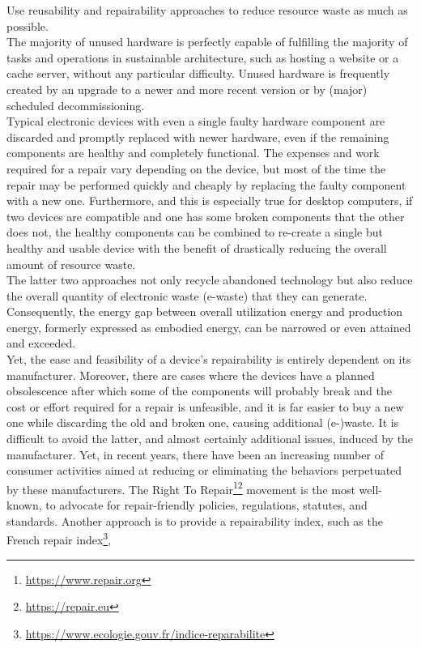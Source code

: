 Use reusability and repairability approaches to reduce resource waste as much as
possible. \\ %
The majority of unused hardware is perfectly capable of fulfilling the majority of
tasks and operations in sustainable architecture, such as hosting a website or a
cache server, without any particular difficulty. Unused hardware is frequently
created by an upgrade to a newer and more recent version or by (major) scheduled
decommissioning. \\ %
Typical electronic devices with even a single faulty hardware component are
discarded and promptly replaced with newer hardware, even if the remaining components
are healthy and completely functional. The expenses and work required for a
repair vary depending on the device, but most of the time the repair may be performed
quickly and cheaply by replacing the faulty component with a new one.
Furthermore, and this is especially true for desktop computers, if two devices
are compatible and one has some broken components that the other does not, the healthy
components can be combined to re-create a single but healthy and usable device with
the benefit of drastically reducing the overall amount of resource waste. \\ %
The latter two approaches not only recycle abandoned technology but also reduce the
overall quantity of electronic waste (e-waste) that they can generate.
Consequently, the energy gap between overall utilization energy and production energy,
formerly expressed as embodied energy, can be narrowed or even attained and exceeded.
\\ %
Yet, the ease and feasibility of a device's repairability is entirely dependent
on its manufacturer. Moreover, there are cases where the devices have a planned
obsolescence after which some of the components will probably break and the cost
or effort required for a repair is unfeasible, and it is far easier to buy a new
one while discarding the old and broken one, causing additional (e-)waste. It is
difficult to avoid the latter, and almost certainly additional issues, induced by
the manufacturer. Yet, in recent years, there have been an increasing number of
consumer activities aimed at reducing or eliminating the behaviors perpetuated
by these manufacturers. The Right To Repair\footnote{\url{https://www.repair.org}}\footnote{\url{https://repair.eu}}
movement is the most well-known, to advocate for repair-friendly policies, regulations,
statutes, and standards. Another approach is to provide a repairability index, such
as the French repair index\footnote{\url{https://www.ecologie.gouv.fr/indice-reparabilite}},
